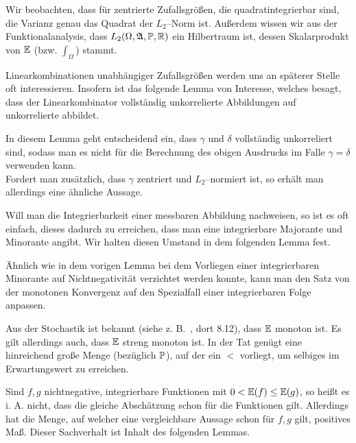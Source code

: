 \documentclass[a4paper]{report}
\numberwithin[\roman]{equation}{sat}
\begin{document}
Wir beobachten, dass für zentrierte Zufallsgrößen, die quadratintegrierbar
sind, die Varianz genau das Quadrat der $L_2$--Norm ist. Außerdem wissen wir
aus der Funktionalanalysis, dass $L_2(\Omega, \mathfrak{A}, \mathbb{P}, \mathbb{R})$ ein
Hilbertraum ist, dessen Skalarprodukt von $\mathbb{E}$ (bzw. $\int_\Omega$) stammt.


\parag
Linearkombinationen unabhängiger Zufallsgrößen werden uns an späterer Stelle
oft interessieren. Insofern ist das folgende Lemma von Interesse, welches
besagt, dass der Linearkombinator vollständig unkorrelierte Abbildungen auf
unkorrelierte abbildet.


\parag
In diesem Lemma geht entscheidend ein, dass $\gamma$ und $\delta$ vollständig
unkorreliert sind, sodass man es nicht für die Berechnung des obigen Ausdrucks
im Falle $\gamma = \delta$ verwenden kann.\\
Fordert man zusätzlich, dass $\gamma$ zentriert und $L_2$--normiert ist, so
erhält man allerdings eine ähnliche Aussage.


\parag
Will man die Integrierbarkeit einer messbaren Abbildung nachweisen, so ist es
oft einfach, dieses dadurch zu erreichen, dass man eine integrierbare Majorante
und Minorante angibt. Wir halten diesen Umstand in dem folgenden Lemma fest.


\parag
Ähnlich wie in dem vorigen Lemma bei dem Vorliegen einer integrierbaren
Minorante auf Nichtnegativität verzichtet werden konnte, kann man den Satz von
der monotonen Konvergenz auf den Spezialfall einer integrierbaren Folge
anpassen.


\parag
Aus der Stochastik ist bekannt (siehe z. B.~\cite{Irle}, dort 8.12), dass $\mathbb{E}$
monoton ist. Es gilt allerdings auch, dass $\mathbb{E}$ streng monoton ist. In der Tat
genügt eine hinreichend große Menge (bezüglich $\mathbb{P}$), auf der ein $<$
vorliegt, um selbiges im Erwartungswert zu erreichen.


\parag
Sind $f,g$ nichtnegative, integrierbare Funktionen mit $0 < \mathbb{E}(f) \le \mathbb{E}(g)$,
so heißt es i. A. nicht, dass die gleiche Abschätzung schon für die Funktionen
gilt. Allerdings hat die Menge, auf welcher eine vergleichbare Aussage schon
für $f, g$ gilt, positives Maß.
Dieser Sachverhalt ist Inhalt des folgenden Lemmas.
\end{document}
